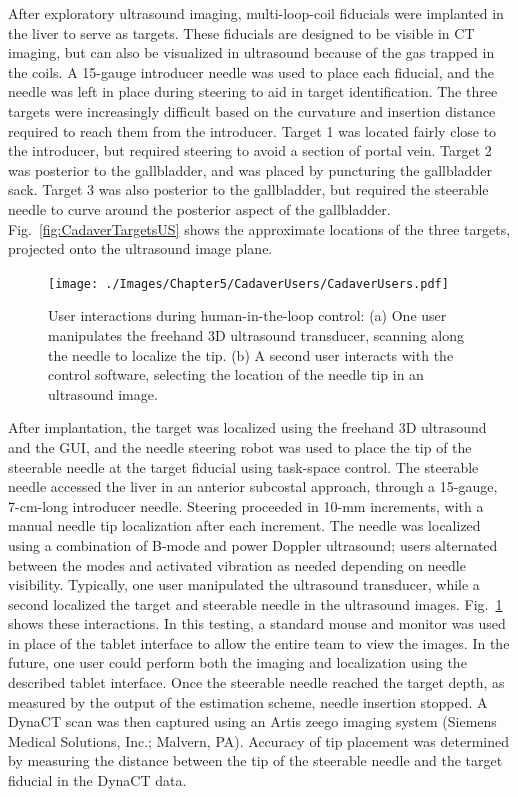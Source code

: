 After exploratory ultrasound imaging, multi-loop-coil fiducials were implanted in the liver to serve as targets. These fiducials are designed to be visible in CT imaging, but can also be visualized in ultrasound because of the gas trapped in the coils. A 15-gauge introducer needle was used to place each fiducial, and the needle was left in place during steering to aid in target identification. The three targets were increasingly difficult based on the curvature and insertion distance required to reach them from the introducer. Target 1 was located fairly close to the introducer, but required steering to avoid a section of portal vein. Target 2 was posterior to the gallbladder, and was placed by puncturing the gallbladder sack. Target 3 was also posterior to the gallbladder, but required the steerable needle to curve around the posterior aspect of the gallbladder. Fig.~\ref{fig:CadaverTargetsUS} shows the approximate locations of the three targets, projected onto the ultrasound image plane.

\begin{figure}[!t]
\centering
\texttt{[image: ./Images/Chapter5/CadaverUsers/CadaverUsers.pdf]}%
\caption[User interactions during human-in-the-loop control]{User interactions during human-in-the-loop control: (a) One user manipulates the freehand 3D ultrasound transducer, scanning along the needle to localize the tip. (b) A second user interacts with the control software, selecting the location of the needle tip in an ultrasound image. }
\label{fig:CadaverUsers}
\end{figure} 

After implantation, the target was localized using the freehand 3D ultrasound and the GUI, and the needle steering robot was used to place the tip of the steerable needle at the target fiducial using task-space control. The steerable needle accessed the liver in an anterior subcostal approach, through a 15-gauge, 7-cm-long introducer needle. Steering proceeded in 10-mm increments, with a manual needle tip localization after each increment. The needle was localized using a combination of B-mode and power Doppler ultrasound; users alternated between the modes and activated vibration as needed depending on needle visibility. Typically, one user manipulated the ultrasound transducer, while a second localized the target and steerable needle in the ultrasound images. Fig.~\ref{fig:CadaverUsers} shows these interactions. In this testing, a standard mouse and monitor was used in place of the tablet interface to allow the entire team to view the images. In the future, one user could perform both the imaging and localization using the described tablet interface. Once the steerable needle reached the target depth, as measured by the output of the estimation scheme, needle insertion stopped. A DynaCT scan was then captured using an Artis zeego imaging system (Siemens Medical Solutions, Inc.; Malvern, PA). Accuracy of tip placement was determined by measuring the distance between the tip of the steerable needle and the target fiducial in the DynaCT data.

